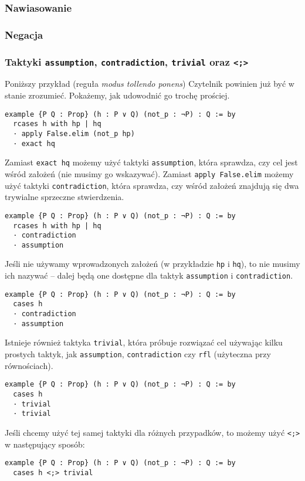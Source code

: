 \documentclass[polish,pretty]{angav}
\newcommand{\Lean}[1]{\texttt{#1}}
\begin{document}
\subsubsection*{Nawiasowanie}

\subsubsection*{Negacja}

\subsubsection*{Taktyki \texttt{assumption}, \texttt{contradiction}, \texttt{trivial} oraz \texttt{<;>}}

Poniższy przykład (reguła \textit{modus tollendo ponens}) Czytelnik powinien już być w stanie zrozumieć. Pokażemy, jak udowodnić go trochę prościej.
\begin{verbatim}
example {P Q : Prop} (h : P ∨ Q) (not_p : ¬P) : Q := by
  rcases h with hp | hq
  · apply False.elim (not_p hp)
  · exact hq
\end{verbatim}

Zamiast \Lean{exact hq} możemy użyć taktyki \Lean{assumption}, która sprawdza, czy cel jest wśród założeń (nie musimy go wskazywać). Zamiast \Lean{apply False.elim} możemy użyć taktyki \Lean{contradiction}, która sprawdza, czy wśród założeń znajdują się dwa trywialne sprzeczne stwierdzenia.
\begin{verbatim}
example {P Q : Prop} (h : P ∨ Q) (not_p : ¬P) : Q := by
  rcases h with hp | hq
  · contradiction
  · assumption
\end{verbatim}

Jeśli nie używamy wprowadzonych założeń (w przykładzie \Lean{hp} i \Lean{hq}), to nie musimy ich nazywać -- dalej będą one dostępne dla taktyk \Lean{assumption} i \Lean{contradiction}.
\begin{verbatim}
example {P Q : Prop} (h : P ∨ Q) (not_p : ¬P) : Q := by
  cases h
  · contradiction
  · assumption
\end{verbatim}

Istnieje również taktyka \Lean{trivial}, która próbuje rozwiązać cel używając kilku prostych taktyk, jak \Lean{assumption}, \Lean{contradiction} czy \Lean{rfl} (użyteczna przy równościach).
\begin{verbatim}
example {P Q : Prop} (h : P ∨ Q) (not_p : ¬P) : Q := by
  cases h
  · trivial
  · trivial
\end{verbatim}

Jeśli chcemy użyć tej samej taktyki dla różnych przypadków, to możemy użyć \Lean{<;>} w następujący sposób:
\begin{verbatim}
example {P Q : Prop} (h : P ∨ Q) (not_p : ¬P) : Q := by
  cases h <;> trivial
\end{verbatim}
\end{document}
